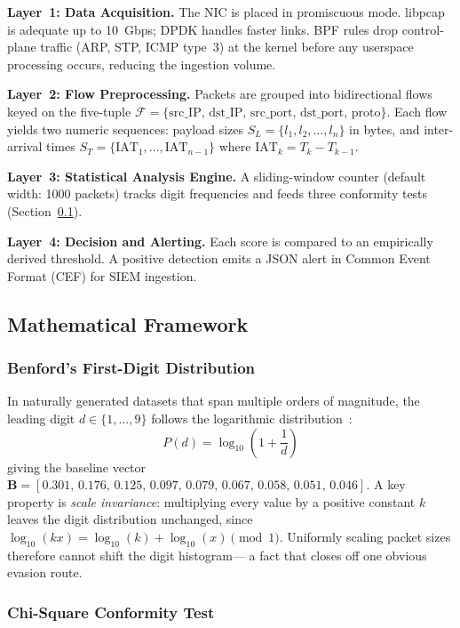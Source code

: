 \documentclass[conference]{IEEEtran}
\begin{document}
\textbf{Layer~1: Data Acquisition.} The NIC is placed in promiscuous mode.
libpcap is adequate up to 10~Gbps; DPDK handles faster links. BPF rules
drop control-plane traffic (ARP, STP, ICMP type~3) at the kernel before
any userspace processing occurs, reducing the ingestion volume.

\textbf{Layer~2: Flow Preprocessing.} Packets are grouped into
bidirectional flows keyed on the five-tuple
$\mathcal{F} = \{\text{src\_IP},\, \text{dst\_IP},\, \text{src\_port},\,
\text{dst\_port},\, \text{proto}\}$.
Each flow yields two numeric sequences: payload sizes
$S_L = \{l_1, l_2, \ldots, l_n\}$ in bytes, and inter-arrival times
$S_T = \{\text{IAT}_1, \ldots, \text{IAT}_{n-1}\}$ where
$\text{IAT}_k = T_k - T_{k-1}$.

\textbf{Layer~3: Statistical Analysis Engine.} A sliding-window counter
(default width: 1000 packets) tracks digit frequencies and feeds three
conformity tests (Section~\ref{sec:math}).

\textbf{Layer~4: Decision and Alerting.} Each score is compared to an
empirically derived threshold. A positive detection emits a JSON alert in
Common Event Format (CEF) for SIEM ingestion.

\subsection{Mathematical Framework}
\label{sec:math}

\subsubsection{Benford's First-Digit Distribution}

In naturally generated datasets that span multiple orders of magnitude,
the leading digit $d \in \{1,\ldots,9\}$ follows the logarithmic
distribution~\cite{b4,b5}:
\begin{equation}
  P(d) = \log_{10}\!\left(1 + \frac{1}{d}\right)
  \label{eq:benford}
\end{equation}
giving the baseline vector
$\mathbf{B} = [0.301,\, 0.176,\, 0.125,\, 0.097,\, 0.079,\, 0.067,\,
0.058,\, 0.051,\, 0.046]$.
A key property is \textit{scale invariance}: multiplying every value by a
positive constant $k$ leaves the digit distribution unchanged, since
$\log_{10}(kx) = \log_{10}(k) + \log_{10}(x) \pmod{1}$.
Uniformly scaling packet sizes therefore cannot shift the digit histogram—
a fact that closes off one obvious evasion route.

\subsubsection{Chi-Square Conformity Test}
\end{document}
